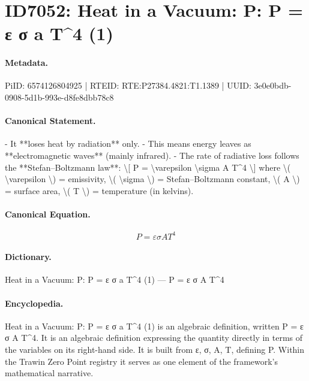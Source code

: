 \section*{ID7052: Heat in a Vacuum: P: P = ε σ a T\textasciicircum{}4 (1)}
\paragraph{Metadata.}
PiID: 6574126804925 | RTEID: RTE:P27384.4821:T1.1389 | UUID: 3e0e0bdb-0908-5d1b-993e-d8fe8dbb78c8

\paragraph{Canonical Statement.}
- It **loses heat by radiation** only. - This means energy leaves as **electromagnetic waves** (mainly infrared). - The rate of radiative loss follows the **Stefan–Boltzmann law**: \textbackslash{}[ P = \textbackslash{}varepsilon \textbackslash{}sigma A T\textasciicircum{}4 \textbackslash{}] where \textbackslash{}( \textbackslash{}varepsilon \textbackslash{}) = emissivity, \textbackslash{}( \textbackslash{}sigma \textbackslash{}) = Stefan–Boltzmann constant, \textbackslash{}( A \textbackslash{}) = surface area, \textbackslash{}( T \textbackslash{}) = temperature (in kelvins).

\paragraph{Canonical Equation.}
\[
P = \varepsilon \sigma A T^4
\]

\paragraph{Dictionary.}
Heat in a Vacuum: P: P = ε σ a T\textasciicircum{}4 (1) — P = ε σ A T\textasciicircum{}4

\paragraph{Encyclopedia.}
Heat in a Vacuum: P: P = ε σ a T\textasciicircum{}4 (1) is an algebraic definition, written P = ε σ A T\textasciicircum{}4. It is an algebraic definition expressing the quantity directly in terms of the variables on its right-hand side. It is built from ε, σ, A, T, defining P. Within the Trawin Zero Point registry it serves as one element of the framework's mathematical narrative.
